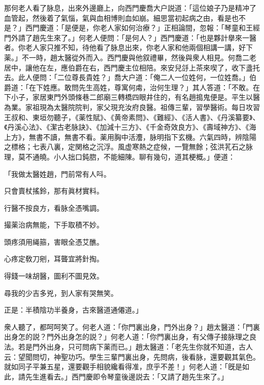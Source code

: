 那何老人看了脉息，出來外邊廳上，向西門慶喬大户説道：「這位娘子乃是精冲了血管起，然後着了氣惱，氣與血相博則血如崩。細思當初起病之由，看是也不是？」西門慶道：「是便是，你老人家如何治療？」正相論間，忽報：「琴童和王經門外請了趙先生來了。」何老人便問：「是何人？」西門慶道：「也是夥計擧來一醫者。你老人家只推不知，待他看了脉息出來，你老人家和他兩個相講一講，好下薬。」不一時，趙太醫從外而入。西門慶與他叙禮畢，然後與衆人相見。何喬二老居中，讓他在左，應伯爵在右，西門慶主位相陪。來安兒㧱上茶來喫了，收下盞托去。此人便問：「二位尊長貴姓？」喬大户道：「俺二人一位姓何，一位姓喬。」伯爵道：「在下姓應。敢問先生高姓，尊寓何䖏，治何生理？」其人答道：「不敢。在下小子，家居東門外頭條巷二郎廟三轉橋四眼井住的，有名趙搗鬼便是。平生以醫為業。家祖現為太醫院院判，家父現充汝府良醫。祖傳三輩，習學醫術。每日攻習王叔和、東垣勿聽子，《薬性賦》、《黄帝素問》、《難經》、《活人書》、《丹溪纂要》、《丹溪心法》、《潔古老脉訣》、《加減十三方》、《千金奇效良方》、《壽域神方》、《海上方》，無書不讀，無書不看。薬用胸中活灋，脉明指下玄機。六氣四時，辨陰陽之標格；七表八裏，定関格之沉浮。風虚寒熱之症候，一覽無餘；弦洪芤石之脉理，莫不通曉。小人拙口鈍脗，不能細陳。聊有幾句，道其梗概。」便道：

\begin{myquote}
「我做太醫姓趙，門前常有人呌。

只會賣杖搖鈴，那有眞材實料。　

行醫不按良方，看脉全憑嘴調。

撮薬治病無能，下手取積不妙。

頭疼須用䋲箍，害眼全憑艾醮。

心疼定敎刀剜，耳聾宜將針掏。

得錢一味胡醫，圖利不圖見效。

尋我的少吉多兇，到人家有哭無笑。

正是：半積陰功半養身，古來醫道通僊道。」
\end{myquote}

衆人聽了，都呵呵笑了。何老人道：「你門裏出身，門外出身？」趙太醫道：「門裏出身怎的説？門外出身怎的説？」何老人道：「你門裏出身，有父傳子接脉理之良法。若是門外出身，只可問病下薬而已。」趙太醫道：「老先生你就不知道，古人云：望聞問切，神聖功巧。學生三輩門裏出身，先問病，後看脉，還要觀其氣色。就如同子平兼五星，還要觀手相貌纔看得准，庶乎不差！」何老人道：「旣是如此，請先生進看去。」西門慶即令琴童後邊説去：「又請了趙先生來了。」

